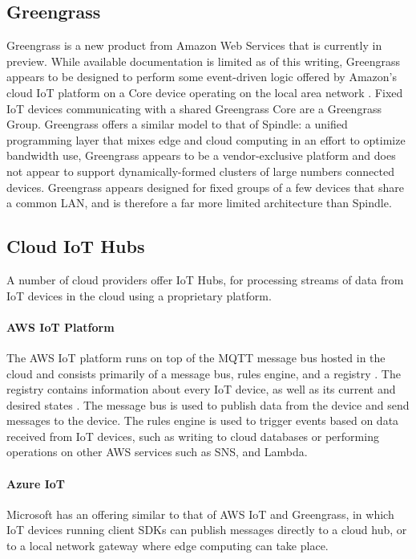 \documentclass{thesis}
\begin{document}
    \subsection{Greengrass}
        Greengrass is a new product from Amazon Web Services that is currently in preview. While available
        documentation is limited as of this writing, Greengrass appears to be designed to perform some
        event-driven logic offered by Amazon's cloud IoT platform on a Core device operating
        on the local area network \cite{greengrass}. Fixed IoT devices communicating with a shared Greengrass Core are a
        Greengrass Group. Greengrass offers
        a similar model to that of Spindle: a unified programming layer that mixes edge and cloud computing
        in an effort to optimize bandwidth use, Greengrass appears to be a vendor-exclusive platform and does
        not appear to support dynamically-formed clusters of large numbers connected devices. Greengrass appears
        designed for fixed groups of a few devices that share a common LAN, and is therefore a far more limited
        architecture than Spindle.
    \subsection{Cloud IoT Hubs}
        A number of cloud providers offer IoT Hubs, for processing streams of data from IoT devices in the cloud
        using a proprietary platform. 
        \paragraph{AWS IoT Platform}
           The AWS IoT platform runs on top of the MQTT message bus hosted in the cloud and consists primarily of a message bus, rules
           engine, and a registry  \cite{aws:iot}\cite{aws:iot:deepdive}. The registry contains information about every IoT device, as
           well as its current and desired states \cite{aws:iot:overview}.
           The message bus is used to publish data from the device and send messages to the device. The rules engine is used to trigger
           events based on data received from IoT devices, such as writing to cloud databases or performing operations on
           other AWS services such as SNS, and Lambda.
        \paragraph{Azure IoT}
            Microsoft has an offering similar to that of AWS IoT and Greengrass, in which IoT devices running client SDKs
            can publish messages directly to a cloud hub, or to a local network gateway where edge computing can take
            place.
\end{document}

